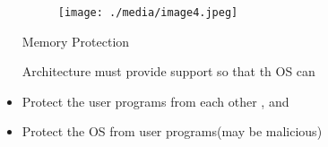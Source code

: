 \documentclass[12pt]{article}
\begin{document}
\begin{itemize}

\par


\vspace{\baselineskip}

\vspace{\baselineskip}

\vspace{\baselineskip}

\vspace{\baselineskip}

\vspace{\baselineskip}

\vspace{\baselineskip}

\vspace{\baselineskip}

\vspace{\baselineskip}

\vspace{\baselineskip}

\vspace{\baselineskip}



\begin{figure}[H]
\advance\leftskip -0.43in		\texttt{[image: ./media/image4.jpeg]}
\end{figure}


\par

\begin{Center}
{\fontsize{24pt}{28.8pt}\selectfont Memory Protection\par}
\end{Center}\par

{\fontsize{18pt}{21.6pt}\selectfont Architecture must provide support so that th OS can\par}\par

	\item {\fontsize{18pt}{21.6pt}\selectfont Protect the user programs from each other , and\par}\par

	\item {\fontsize{18pt}{21.6pt}\selectfont Protect the OS from user programs(may be malicious)\par}
\end{itemize}\par
\end{document}
